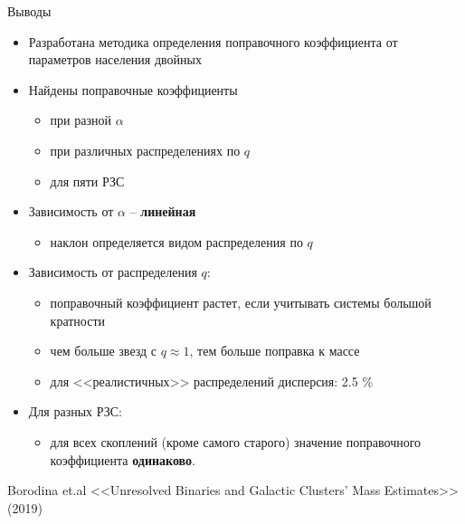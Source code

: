 \documentclass[pdf]{beamer}
\begin{document}
	\begin{frame}{Выводы}
		\begin{itemize}
			\item Разработана методика определения поправочного коэффициента от параметров населения двойных
		
			\item Найдены поправочные коэффициенты
			\begin{itemize}
				\item при разной $\alpha$
				\item при различных распределениях по $q$
				\item для пяти РЗС
			\end{itemize}
			
			\item Зависимость от $\alpha$ --  {\bf линейная}
			\begin{itemize}
				\item наклон определяется видом распределения по $q$
			\end{itemize}
		
			\item Зависимость от распределения $q$:
			\begin{itemize}
				\item поправочный коэффициент растет, если учитывать системы большой кратности
				\item чем больше звезд с $q \approx 1$, тем больше поправка к массе
				\item для <<реалистичных>> распределений дисперсия: 2.5 \%
			\end{itemize}
			
			\item Для разных РЗС:
			\begin{itemize}
				\item для всех скоплений (кроме самого старого) значение поправочного коэффициента {\bf одинаково}.
			\end{itemize}
		\end{itemize}
%		
	\vspace{2cm}

	{\footnotesize Borodina et.al  <<Unresolved Binaries and Galactic Clusters’ Mass Estimates>> (2019)}
	\end{frame}

	
\end{document}
